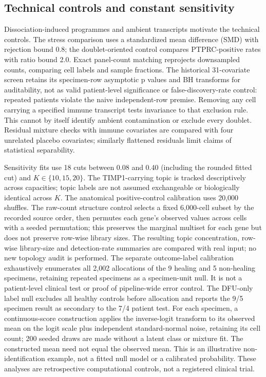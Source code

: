 \documentclass[10pt,a4paper]{article}
\begin{document}
\subsection{Technical controls and constant sensitivity}
Dissociation-induced programmes and ambient transcripts motivate the technical controls. The stress comparison uses a standardized mean difference (SMD) with rejection bound 0.8; the doublet-oriented control compares PTPRC-positive rates with ratio bound 2.0. Exact panel-count matching reprojects downsampled counts, comparing cell labels and sample fractions. The historical 31-covariate screen retains its specimen-row asymptotic p values and BH transforms for auditability, not as valid patient-level significance or false-discovery-rate control: repeated patients violate the naive independent-row premise. Removing any cell carrying a specified immune transcript tests invariance to that exclusion rule. This cannot by itself identify ambient contamination or exclude every doublet. Residual mixture checks with immune covariates are compared with four unrelated placebo covariates; similarly flattened residuals limit claims of statistical separability.

Sensitivity fits use 18 cuts between 0.08 and 0.40 (including the rounded fitted cut) and $K\in\{10,15,20\}$. The TIMP1-carrying topic is tracked descriptively across capacities; topic labels are not assumed exchangeable or biologically identical across $K$. The anatomical positive-control calibration uses 20,000 shuffles. The raw-count structure control selects a fixed 6,000-cell subset by the recorded source order, then permutes each gene's observed values across cells with a seeded permutation; this preserves the marginal multiset for each gene but does not preserve row-wise library sizes. The resulting topic concentration, row-wise library-size and detection-rate summaries are compared with real input; no new topology audit is performed. The separate outcome-label calibration exhaustively enumerates all 2,002 allocations of the 9 healing and 5 non-healing specimens, retaining repeated specimens as a specimen-unit null. It is not a patient-level clinical test or proof of pipeline-wide error control. The DFU-only label null excludes all healthy controls before allocation and reports the 9/5 specimen result as secondary to the 7/4 patient test. For each specimen, a continuous-score construction applies the inverse-logit transform to its observed mean on the logit scale plus independent standard-normal noise, retaining its cell count; 200 seeded draws are made without a latent class or mixture fit. The constructed mean need not equal the observed mean. This is an illustrative non-identification example, not a fitted null model or a calibrated probability. These analyses are retrospective computational controls, not a registered clinical trial.
\end{document}
